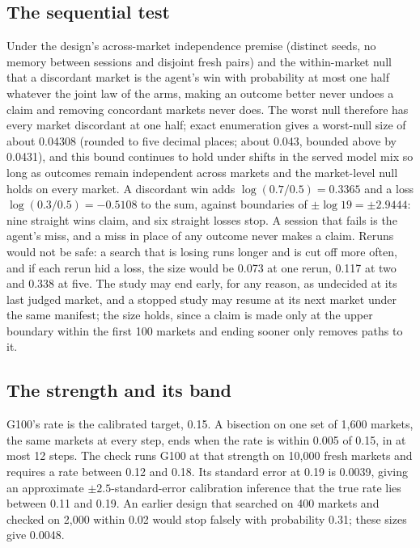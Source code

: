 \documentclass[11pt]{article}
\begin{document}
\subsection{The sequential test}

Under the design's across-market independence premise (distinct seeds, no memory between sessions and disjoint fresh pairs) and the within-market null that a discordant market is the agent's win with probability at most one half whatever the joint law of the arms, making an outcome better never undoes a claim and removing concordant markets never does. The worst null therefore has every market discordant at one half; exact enumeration gives a worst-null size of about 0.04308 (rounded to five decimal places; about 0.043, bounded above by 0.0431), and this bound continues to hold under shifts in the served model mix so long as outcomes remain independent across markets and the market-level null holds on every market. A discordant win adds $\log(0.7/0.5)=0.3365$ and a loss $\log(0.3/0.5)=-0.5108$ to the sum, against boundaries of $\pm\log19=\pm2.9444$: nine straight wins claim, and six straight losses stop. A session that fails is the agent's miss, and a miss in place of any outcome never makes a claim. Reruns would not be safe: a search that is losing runs longer and is cut off more often, and if each rerun hid a loss, the size would be 0.073 at one rerun, 0.117 at two and 0.338 at five. The study may end early, for any reason, as undecided at its last judged market, and a stopped study may resume at its next market under the same manifest; the size holds, since a claim is made only at the upper boundary within the first 100 markets and ending sooner only removes paths to it.

\subsection{The strength and its band}

G100's rate is the calibrated target, 0.15. A bisection on one set of 1{,}600 markets, the same markets at every step, ends when the rate is within 0.005 of 0.15, in at most 12 steps. The check runs G100 at that strength on 10{,}000 fresh markets and requires a rate between 0.12 and 0.18. Its standard error at 0.19 is 0.0039, giving an approximate $\pm2.5$-standard-error calibration inference that the true rate lies between 0.11 and 0.19. An earlier design that searched on 400 markets and checked on 2{,}000 within 0.02 would stop falsely with probability 0.31; these sizes give 0.0048.
\end{document}
